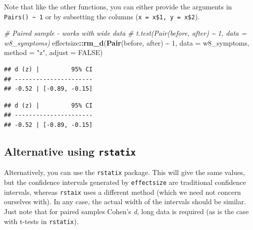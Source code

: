 \documentclass[
]{book}
\newenvironment{Shaded}{\begin{snugshade}}{\end{snugshade}}
\newcommand{\AttributeTok}[1]{\textcolor[rgb]{0.13,0.29,0.53}{#1}}
\newcommand{\CommentTok}[1]{\textcolor[rgb]{0.56,0.35,0.01}{\textit{#1}}}
\newcommand{\ConstantTok}[1]{\textcolor[rgb]{0.56,0.35,0.01}{#1}}
\newcommand{\DecValTok}[1]{\textcolor[rgb]{0.00,0.00,0.81}{#1}}
\newcommand{\FunctionTok}[1]{\textcolor[rgb]{0.13,0.29,0.53}{\textbf{#1}}}
\newcommand{\NormalTok}[1]{#1}
\newcommand{\SpecialCharTok}[1]{\textcolor[rgb]{0.81,0.36,0.00}{\textbf{#1}}}
\newcommand{\StringTok}[1]{\textcolor[rgb]{0.31,0.60,0.02}{#1}}
\begin{document}
Note that like the other functions, you can either provide the arguments in \texttt{Pairs()\ \textasciitilde{}\ 1} or by subsetting the columns (\texttt{x\ =\ x\$1,\ y\ =\ x\$2}).

\begin{Shaded}
\begin{Highlighting}[]
\CommentTok{\# Paired sample {-} works with wide data}
\CommentTok{\# t.test(Pair(before, after) \textasciitilde{} 1, data = w8\_symptoms)}
\NormalTok{effectsize}\SpecialCharTok{::}\FunctionTok{rm\_d}\NormalTok{(}\FunctionTok{Pair}\NormalTok{(before, after) }\SpecialCharTok{\textasciitilde{}} \DecValTok{1}\NormalTok{, }\AttributeTok{data =}\NormalTok{ w8\_symptoms, }\AttributeTok{method =} \StringTok{"z"}\NormalTok{, }\AttributeTok{adjust =} \ConstantTok{FALSE}\NormalTok{)}
\end{Highlighting}
\end{Shaded}

\begin{verbatim}
## d (z) |         95% CI
## ----------------------
## -0.52 | [-0.89, -0.15]
\end{verbatim}

\begin{Shaded}
\end{Shaded}

\begin{verbatim}
## d (z) |         95% CI
## ----------------------
## -0.52 | [-0.89, -0.15]
\end{verbatim}

\subsection{\texorpdfstring{Alternative using \texttt{rstatix}}{Alternative using rstatix}}\label{alternative-using-rstatix}

Alternatively, you can use the \texttt{rstatix} package. This will give the same values, but the confidence intervals generated by \texttt{effectsize} are traditional confidence intervals, whereas \texttt{rstaix} uses a different method (which we need not concern ourselves with). In any case, the actual width of the intervals should be similar. Just note that for paired samples Cohen's \emph{d}, long data is required (as is the case with t-tests in \texttt{rstatix}).
\end{document}
